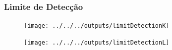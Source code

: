 
%   
%
%   
%   
%   
%   
%   
%   
   


\begin{frame}
  \frametitle{Limite de Detecção}
  \begin{figure}[H]
  \centering
    \begin{minipage}[b]{0.40\linewidth}
      \texttt{[image: ../../../outputs/limitDetectionK]}
    \end{minipage}
    \quad
    \begin{minipage}[b]{0.40\linewidth}
      \texttt{[image: ../../../outputs/limitDetectionL]}
    \end{minipage}
  \end{figure}
\end{frame}

